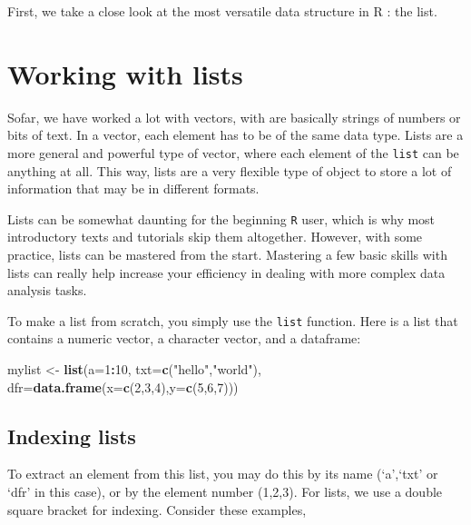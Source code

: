 \documentclass[]{book}
\newenvironment{Shaded}{\begin{snugshade}}{\end{snugshade}}
\newcommand{\DataTypeTok}[1]{\textcolor[rgb]{0.13,0.29,0.53}{#1}}
\newcommand{\DecValTok}[1]{\textcolor[rgb]{0.00,0.00,0.81}{#1}}
\newcommand{\KeywordTok}[1]{\textcolor[rgb]{0.13,0.29,0.53}{\textbf{#1}}}
\newcommand{\NormalTok}[1]{#1}
\newcommand{\OperatorTok}[1]{\textcolor[rgb]{0.81,0.36,0.00}{\textbf{#1}}}
\newcommand{\StringTok}[1]{\textcolor[rgb]{0.31,0.60,0.02}{#1}}
\begin{document}
First, we take a close look at the most versatile data structure in R : the list.

\hypertarget{workinglists}{%
\section{Working with lists}\label{workinglists}}

Sofar, we have worked a lot with vectors, with are basically strings of numbers or bits of text. In a vector, each element has to be of the same data type. Lists are a more general and powerful type of vector, where each element of the \texttt{list} can be anything at all. This way, lists are a very flexible type of object to store a lot of information that may be in different formats.

Lists can be somewhat daunting for the beginning \texttt{R} user, which is why most introductory texts and tutorials skip them altogether. However, with some practice, lists can be mastered from the start. Mastering a few basic skills with lists can really help increase your efficiency in dealing with more complex data analysis tasks.

To make a list from scratch, you simply use the \texttt{list} function. Here is a list that contains a numeric vector, a character vector, and a dataframe:

\begin{Shaded}
\begin{Highlighting}[]
\NormalTok{mylist <-}\StringTok{ }\KeywordTok{list}\NormalTok{(}\DataTypeTok{a=}\DecValTok{1}\OperatorTok{:}\DecValTok{10}\NormalTok{, }\DataTypeTok{txt=}\KeywordTok{c}\NormalTok{(}\StringTok{"hello"}\NormalTok{,}\StringTok{"world"}\NormalTok{), }\DataTypeTok{dfr=}\KeywordTok{data.frame}\NormalTok{(}\DataTypeTok{x=}\KeywordTok{c}\NormalTok{(}\DecValTok{2}\NormalTok{,}\DecValTok{3}\NormalTok{,}\DecValTok{4}\NormalTok{),}\DataTypeTok{y=}\KeywordTok{c}\NormalTok{(}\DecValTok{5}\NormalTok{,}\DecValTok{6}\NormalTok{,}\DecValTok{7}\NormalTok{)))}
\end{Highlighting}
\end{Shaded}

\hypertarget{indexing-lists}{%
\subsection{Indexing lists}\label{indexing-lists}}

To extract an element from this list, you may do this by its name (`a',`txt' or `dfr' in this case), or by the element number (1,2,3). For lists, we use a double square bracket for indexing. Consider these examples,
\end{document}
